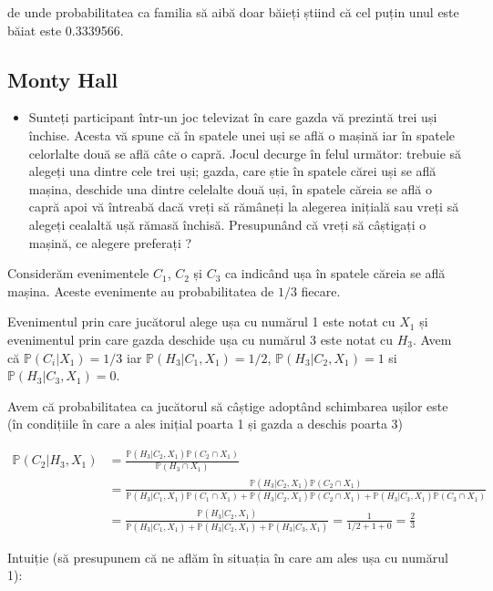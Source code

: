 \documentclass[]{article}
\newenvironment{frshaded*}{%
  \def\FrameCommand{\fboxrule=\FrameRule\fboxsep=\FrameSep \fcolorbox{framecolor}{shadecolor1}}%
  \MakeFramed {\advance\hsize-\width \FrameRestore}}%
{\endMakeFramed}
\newenvironment{rmdblock}[1]
  {\begin{frshaded*}
  \begin{itemize}
  \renewcommand{\labelitemi}{
    \raisebox{-.7\height}[0pt][0pt]{
      {\setkeys{Gin}{width=2em,keepaspectratio}\texttt{[image: images/icons/\#1]}}
    }
  }
  \item
  }
  {
  \end{itemize}
  \end{frshaded*}
  }
\newenvironment{rmdexercise}
  {\begin{rmdblock}{exercise}}
  {\end{rmdblock}}
\begin{document}
de unde probabilitatea ca familia să aibă doar băieți știind că cel
puțin unul este băiat este 0.3339566.

\hypertarget{monty-hall}{%
\subsection{Monty Hall}\label{monty-hall}}

\begin{rmdexercise}
Sunteți participant într-un joc televizat în care gazda vă prezintă trei
uși închise. Acesta vă spune că în spatele unei uși se află o mașină iar
în spatele celorlalte două se află câte o capră. Jocul decurge în felul
următor: trebuie să alegeți una dintre cele trei uși; gazda, care știe
în spatele cărei uși se află mașina, deschide una dintre celelalte două
uși, în spatele căreia se află o capră apoi vă întreabă dacă vreți să
rămâneți la alegerea inițială sau vreți să alegeți cealaltă ușă rămasă
închisă. Presupunând că vreți să câștigați o mașină, ce alegere
preferați ?
\end{rmdexercise}

Considerăm evenimentele \(C_1\), \(C_2\) și \(C_3\) ca indicând ușa în
spatele căreia se află mașina. Aceste evenimente au probabilitatea de
\(1/3\) fiecare.

Evenimentul prin care jucătorul alege ușa cu numărul 1 este notat cu
\(X_1\) și evenimentul prin care gazda deschide ușa cu numărul 3 este
notat cu \(H_3\). Avem că \(\mathbb{P}(C_i|X_1) = 1/3\) iar
\(\mathbb{P}(H_3|C_1,X_1) = 1/2\), \(\mathbb{P}(H_3|C_2,X_1) = 1\) si
\(\mathbb{P}(H_3|C_3,X_1) = 0\).

Avem că probabilitatea ca jucătorul să câștige adoptând schimbarea
ușilor este (în condițiile în care a ales inițial poarta 1 și gazda a
deschis poarta 3)

\[
\begin{aligned}
  \mathbb{P}(C_2|H_3,X_1) &= \frac{\mathbb{P}(H_3|C_2,X_1)\mathbb{P}(C_2\cap X_1)}{\mathbb{P}(H_3\cap X_1)}\\
  &=\frac{\mathbb{P}(H_3|C_2,X_1)\mathbb{P}(C_2\cap X_1)}{\mathbb{P}(H_3|C_1,X_1)\mathbb{P}(C_1\cap X_1)+\mathbb{P}(H_3|C_2,X_1)\mathbb{P}(C_2\cap X_1)+\mathbb{P}(H_3|C_3,X_1)\mathbb{P}(C_3\cap X_1)}\\
  &= \frac{\mathbb{P}(H_3|C_2,X_1)}{\mathbb{P}(H_3|C_1,X_1)+\mathbb{P}(H_3|C_2,X_1)+\mathbb{P}(H_3|C_3,X_1)} = \frac{1}{1/2+1+0} = \frac{2}{3}
\end{aligned}
\]

Intuiție (să presupunem că ne aflăm în situația în care am ales ușa cu
numărul 1):
\end{document}
